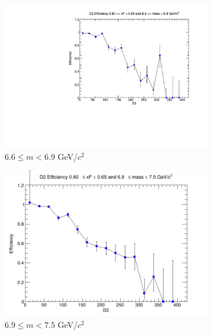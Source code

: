 \documentclass[11pt]{article}
\begin{document}
\begin{figure}[p]
\begin{subfigure}[b]{0.32\textwidth}
        \includegraphics[width=\textwidth]{./kTrackerEfficiencyPlots/D2_Efficiency_xF12_mass8.pdf}
        \caption{$6.6 \leq m < 6.9$ GeV/$c^2$}
    \end{subfigure}\vspace{0.5cm}
    \begin{subfigure}[b]{0.32\textwidth}
        \centering
        \includegraphics[width=\textwidth]{./kTrackerEfficiencyPlots/D2_Efficiency_xF12_mass9.png}
        \caption{$6.9 \leq m < 7.5$ GeV/$c^2$}
    \end{subfigure}\hfill
    \begin{subfigure}[b]{0.32\textwidth}
        \centering

\end{subfigure}
\end{figure}
\end{document}
